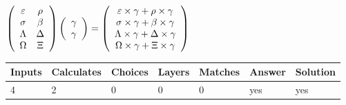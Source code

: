 \documentclass[12pt]{article}
\begin{document}
$  %
 \left( \begin{array}
 {
 c
 c
 }
 \varepsilon & 
 \rho \\ 
 \sigma & 
 \beta \\ 
 \Lambda & 
 \Delta \\ 
 \Omega & 
                    \Xi
 \end{array} \right)
 \left( \begin{array}
 {
 c
 }
 \gamma \\ 
 \gamma
 \end{array} \right)
=
  \left( \begin{array}
 {
 c
 }
 \varepsilon \times  \gamma   +  \rho \times  \gamma \\ 
 \sigma \times  \gamma   +  \beta \times  \gamma \\ 
 \Lambda \times  \gamma   +  \Delta \times  \gamma \\ 
 \Omega \times  \gamma   +                     \Xi \times  \gamma
 \end{array} \right)
$
 
 
 
\noindent{}
 
 

 
 
 
\noindent{}
 
 

 
 
\noindent{}
 
 

 
\vspace{0.3in}
   
   
   
   
\noindent\begin{tabular}{|l|l|l|l|l|l|l|}
 \hline
Inputs & Calculates & Choices & Layers & Matches & Answer & Solution \\ \hline
           4 & 
           2 & 
           0
  & 
           0 & 
           0 & 
  yes & 
  yes 
  \\ \hline
 \end{tabular}
   
   
   
   
\noindent{}
   
\end{document}
